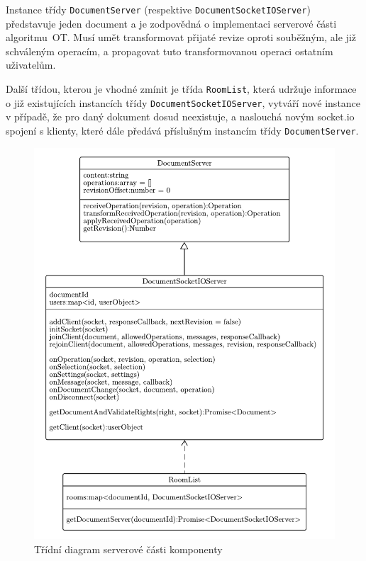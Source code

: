 Instance třídy \texttt{DocumentServer} (respektive \texttt{DocumentSocketIOServer}) představuje jeden document a je zodpovědná o implementaci serverové části algoritmu~\gls{OT}.
Musí umět transformovat přijaté revize oproti souběžným, ale již schváleným operacím, a propagovat tuto transformovanou operaci ostatním uživatelům.

Další třídou, kterou je vhodné zmínit je třída \texttt{RoomList}, která udržuje informace o již existujících instancích třídy \texttt{DocumentSocketIOServer}, vytváří nové instance v případě, že pro daný dokument dosud neexistuje, a naslouchá novým socket.io spojení s klienty, které dále předává příslušným instancím třídy \texttt{DocumentServer}.

\begin{figure}[ht!]
    \centering
    \includegraphics[width=\textwidth]{partials/navrh/DocumentServer.pdf}
    \caption{Třídní diagram serverové části komponenty}\label{fig:DocumentServer}
\end{figure}
